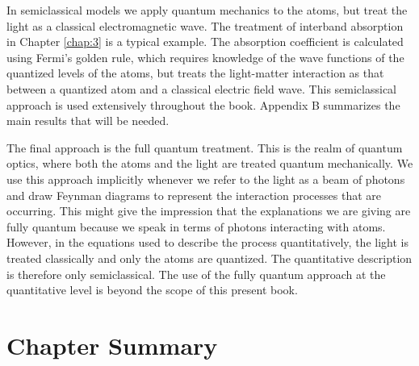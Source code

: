 \documentclass[12pt]{book}
\begin{document}
In semiclassical models we apply quantum mechanics to the atoms, but treat the light as a classical electromagnetic wave. The treatment of interband absorption in Chapter \ref{chap:3} is a typical example. The absorption coefficient is calculated using Fermi's golden rule, which requires knowledge of the wave functions of the quantized levels of the atoms, but treats the light-matter interaction as that between a quantized atom and a classical electric field wave. This semiclassical approach is used extensively throughout the book. Appendix B summarizes the main results that will be needed.

The final approach is the full quantum treatment. This is the realm of quantum optics, where both the atoms and the light are treated quantum mechanically. We use this approach implicitly whenever we refer to the light as a beam of photons and draw Feynman diagrams to represent the interaction  processes that are occurring. This might give the impression that the explanations we are giving are fully quantum because we speak in terms of photons interacting with atoms. However, in the equations used to describe the process quantitatively, the light is treated classically and only the atoms are quantized. The quantitative description is therefore only semiclassical. The use of the fully quantum approach at the quantitative level is beyond the scope of this present book.

\section*{Chapter Summary}
\end{document}
